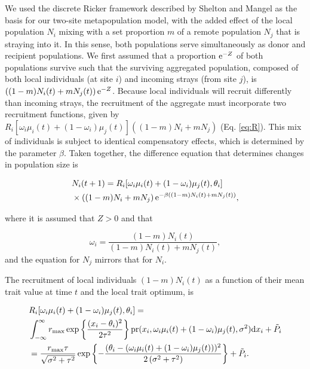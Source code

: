 \documentclass{revtex4}
\begin{document}
We used the discrete Ricker framework described by Shelton and Mangel \citep{Shelton:2011eq} as the basis for our two-site metapopulation model, with the added effect of the local population $N_i$ mixing with a set proportion $m$ of a remote population $N_j$ that is straying into it.
In this sense, both populations serve simultaneously as donor and recipient populations.
We first assumed that a proportion ${\rm e}^{-Z}$ of both populations survive such that the surviving aggregated population, composed of both local individuals (at site $i$) and incoming strays (from site $j$), is $\left((1-m)N_i(t) + m N_j(t) \right){\rm e}^{-Z}$.
Because local individuals will recruit differently than incoming strays, the recruitment of the aggregate must incorporate two recruitment functions, given by $R_i[\omega_i\mu_i(t) + (1-\omega_i)\mu_j(t)]\left((1-m)N_i + mN_j\right)$ (Eq. \ref{eq:R}).
This mix of individuals is subject to identical compensatory effects, which is determined by the parameter $\beta$.
Taken together, the difference equation that determines changes in population size is

\begin{align}
  &N_i(t+1) = R_i[\omega_i\mu_i(t) + (1-\omega_i)\mu_j(t),\theta_i] \\ \nonumber
  &\times \left((1-m)N_i + mN_j\right){\rm e}^{-\beta ((1-m)N_i(t) + m N_j(t))},
  \label{eq:N}
\end{align}

\noindent where it is assumed that $Z>0$ and that

\begin{equation}
\omega_i=\frac{(1-m)N_i(t)}{(1-m) N_i(t) + m N_j(t)},
\end{equation} 
and the equation for $N_j$ mirrors that for $N_i$.

The recruitment of local individuals $(1-m)N_i(t)$ as a function of their mean trait value at time $t$ and the local trait optimum, is

\begin{align}
  &R_i[\omega_i\mu_i(t) + (1-\omega_i)\mu_j(t),\theta_i] = \\ \nonumber
  &\int_{-\infty}^\infty r_{\rm max}\exp\left\{\frac{(x_i-\theta_i)^2}{2\tau^2}\right\} {\rm pr}(x_i,\omega_i\mu_i(t) + (1-\omega_i)\mu_j(t),\sigma^2) {\rm d}x_i +\tilde{P}_i\\ \nonumber
  &= \frac{r_{\rm max} \tau  }{\sqrt{\sigma ^2+\tau ^2}}\exp\left\{-\frac{(\theta_i-(\omega_i\mu_i(t) + (1-\omega_i)\mu_j(t)))^2}{2 \left(\sigma ^2+\tau ^2\right)}\right\} +\tilde{P}_i.
\end{align}
\end{document}
